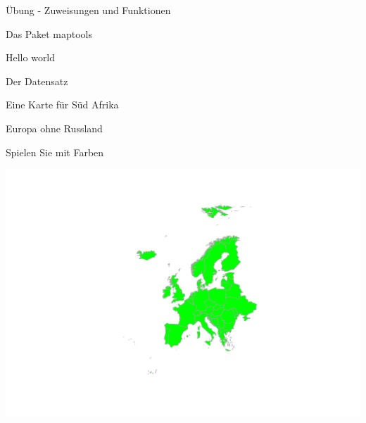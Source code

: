 \documentclass[ignorenonframetext,]{beamer}
\newenvironment{Shaded}{\begin{snugshade}}{\end{snugshade}}
\newcommand{\DataTypeTok}[1]{\textcolor[rgb]{0.74,0.68,0.62}{\underline{#1}}}
\newcommand{\KeywordTok}[1]{\textcolor[rgb]{0.26,0.66,0.93}{\textbf{#1}}}
\newcommand{\NormalTok}[1]{\textcolor[rgb]{0.74,0.68,0.62}{#1}}
\newcommand{\OperatorTok}[1]{\textcolor[rgb]{0.74,0.68,0.62}{#1}}
\newcommand{\StringTok}[1]{\textcolor[rgb]{0.02,0.61,0.04}{#1}}
\begin{document}
\begin{frame}[fragile]{Übung - Zuweisungen und Funktionen}
\begin{frame}[fragile]{Das Paket maptools}
\begin{frame}[fragile]{Hello world}
\begin{frame}[fragile]{Der Datensatz}
\begin{frame}[fragile]{Eine Karte für Süd Afrika}
\begin{frame}[fragile]{Europa ohne Russland}
\end{frame}

\begin{frame}[fragile]{Spielen Sie mit Farben}
\protect\hypertarget{spielen-sie-mit-farben}{}

\begin{Shaded}
\end{Shaded}

\includegraphics{Geomedizin_files/figure-beamer/unnamed-chunk-77-1.pdf}

\begin{Shaded}
\end{Shaded}


\end{frame}
\end{frame}
\end{frame}
\end{frame}
\end{frame}
\end{frame}
\end{document}
